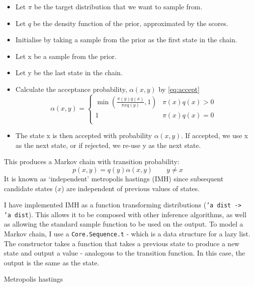 \documentclass[sigconf]{acmart}
\begin{document}
\begin{itemize}
\item Let $\pi$ be the target distribution that we want to sample from.
\item Let $q$ be the density function of the prior, approximated by the scores.
\item Initialise by taking a sample from the prior as the first state in the chain.
\item Let x be a sample from the prior.
\item Let y be the last state in the chain.
\item Calculate the acceptance probability, $\alpha(x,y)$ by \eqref{eq:accept}
  \begin{equation}
    \label{eq:accept}
    \alpha(x,y) =
    \begin{cases}
      \min{\left( \frac{\pi(y)q(x)}{\pi{x}q(y)},1 \right) } & \pi(x)q(x) > 0 \\
      1                                                     & \pi(x)q(x) = 0 \\
    \end{cases}
  \end{equation}
\item The state x is then accepted with probability $\alpha(x,y)$. If accepted, we use x as the next state, or if rejected, we re-use y as the next state.
\end{itemize}

This produces a Markov chain with transition probability: \[p(x, y) = q(y)\alpha(x, y) \quad\quad y\neq x\]
It is known as `independent' metropolis hastings (IMH) since subsequent candidate states ($x$) are independent of previous values of states.

I have implemented IMH as a function transforming distributions (\texttt{'a dist -> 'a dist}). This allows it to be composed with other inference algorithms, as well as allowing the standard sample function to be used on the output. To model a Markov chain, I use a \texttt{Core.Sequence.t} - which is a data structure for a lazy list. The constructor takes a function that takes a previous state to produce a new state and output a value - analogous to the transition function. In this case, the output is the same as the state.

\begin{listing}[H]
  \centering
  \caption{Metropolis hastings}
  \label{lst:mh}
\end{listing}
\end{document}
